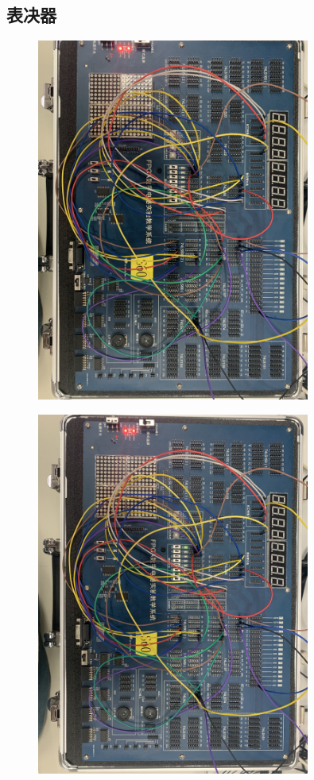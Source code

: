 \documentclass[UTF8, a4paper, 11pt]{article}
\begin{document}
\subsection{表决器}
\begin{figure}[H]
    \centering
    \includegraphics[width=0.8\textwidth]{箱000.png}
\end{figure}
\begin{figure}[H]
    \centering
    \includegraphics[width=0.8\textwidth]{箱001.png}
\end{figure}
\end{document}
